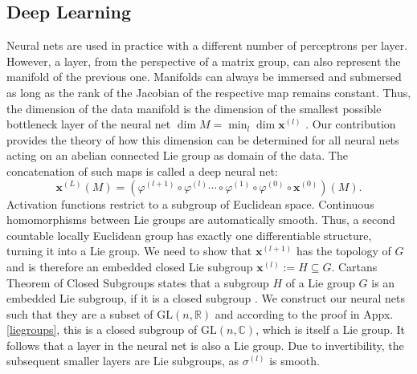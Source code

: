 \documentclass[envcountsect,runningheads]{llncs}
\begin{document}
\subsection{Deep Learning}

Neural nets are used in practice with a different number of perceptrons per layer. However, a layer, from the perspective of a matrix group, can also represent the manifold of the previous one. Manifolds can always be immersed and submersed as long as the rank of the Jacobian of the respective map remains constant. Thus, the dimension of the data manifold is the dimension of the smallest possible bottleneck layer of the neural net  $\dim M = \min_l \dim \textbf{x}^{(l)}$ . Our contribution provides the theory of how this dimension can be determined for all neural nets acting on an abelian connected Lie group as domain of the data. The concatenation of such maps is called a deep neural net:
\begin{equation}
    \textbf{x}^{(L)}(M) = \left(\varphi^{(l+1)} \circ \varphi^{(l)} \cdots \circ \varphi^{(1)} \circ \varphi^{(0)} \circ \textbf{x}^{(0)}\right)(M).
\end{equation}
Activation functions restrict to a subgroup of Euclidean space. Continuous homomorphisms between Lie groups are automatically smooth. Thus, a second countable locally Euclidean group has exactly one differentiable structure, turning it into a Lie group. We need to show that $\textbf{x}^{(l+1)}$ has the topology of $G$ and is therefore an embedded closed Lie subgroup $\textbf{x}^{(l)} := H \subseteq G$. Cartans Theorem of Closed Subgroups states that a subgroup $H$ of a Lie group $G$ is an embedded Lie subgroup, if it is a closed subgroup . We construct our neural nets such that they are a subset of $\text{GL}(n,\mathbb{R})$ and according to the proof in Appx. \ref{liegroups}, this is a closed subgroup of $\text{GL}(n,\mathbb{C})$, which is itself a Lie group. It follows that a layer in the neural net is also a Lie group. Due to invertibility, the subsequent smaller layers are Lie subgroups, as $\sigma^{(l)}$ is smooth.
\end{document}
